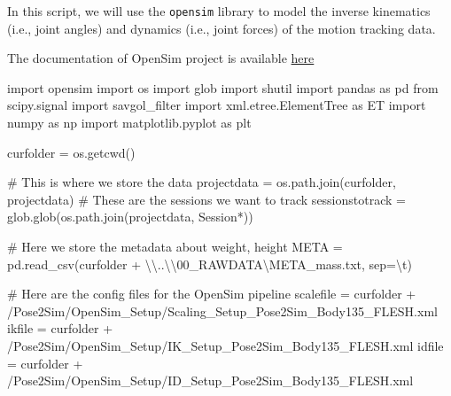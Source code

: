 \documentclass[
  letterpaper,
  DIV=11,
  numbers=noendperiod]{scrreprt}
\newenvironment{Shaded}{\begin{snugshade}}{\end{snugshade}}
\newcommand{\CharTok}[1]{\textcolor[rgb]{0.13,0.47,0.30}{#1}}
\newcommand{\CommentTok}[1]{\textcolor[rgb]{0.37,0.37,0.37}{#1}}
\newcommand{\ImportTok}[1]{\textcolor[rgb]{0.00,0.46,0.62}{#1}}
\newcommand{\NormalTok}[1]{\textcolor[rgb]{0.00,0.23,0.31}{#1}}
\newcommand{\OperatorTok}[1]{\textcolor[rgb]{0.37,0.37,0.37}{#1}}
\newcommand{\StringTok}[1]{\textcolor[rgb]{0.13,0.47,0.30}{#1}}
\begin{document}
In this script, we will use the \texttt{opensim} library to model the
inverse kinematics (i.e., joint angles) and dynamics (i.e., joint
forces) of the motion tracking data.

The documentation of OpenSim project is available
\href{https://opensimconfluence.atlassian.net/wiki/spaces/OpenSim/overview}{here}

\begin{Shaded}
\begin{Highlighting}[]
\ImportTok{import}\NormalTok{ opensim}
\ImportTok{import}\NormalTok{ os}
\ImportTok{import}\NormalTok{ glob}
\ImportTok{import}\NormalTok{ shutil}
\ImportTok{import}\NormalTok{ pandas }\ImportTok{as}\NormalTok{ pd}
\ImportTok{from}\NormalTok{ scipy.signal }\ImportTok{import}\NormalTok{ savgol\_filter}
\ImportTok{import}\NormalTok{ xml.etree.ElementTree }\ImportTok{as}\NormalTok{ ET}
\ImportTok{import}\NormalTok{ numpy }\ImportTok{as}\NormalTok{ np}
\ImportTok{import}\NormalTok{ matplotlib.pyplot }\ImportTok{as}\NormalTok{ plt}

\NormalTok{curfolder }\OperatorTok{=}\NormalTok{ os.getcwd()}

\CommentTok{\# This is where we store the data}
\NormalTok{projectdata }\OperatorTok{=}\NormalTok{ os.path.join(curfolder, }\StringTok{\textquotesingle{}projectdata\textquotesingle{}}\NormalTok{)}
\CommentTok{\# These are the sessions we want to track}
\NormalTok{sessionstotrack }\OperatorTok{=}\NormalTok{ glob.glob(os.path.join(projectdata, }\StringTok{\textquotesingle{}Session*\textquotesingle{}}\NormalTok{))}

\CommentTok{\# Here we store the metadata about weight, height}
\NormalTok{META }\OperatorTok{=}\NormalTok{ pd.read\_csv(curfolder }\OperatorTok{+} \StringTok{\textquotesingle{}}\CharTok{\textbackslash{}\textbackslash{}}\StringTok{..}\CharTok{\textbackslash{}\textbackslash{}}\StringTok{00\_RAWDATA\textbackslash{}META\_mass.txt\textquotesingle{}}\NormalTok{, sep}\OperatorTok{=}\StringTok{\textquotesingle{}}\CharTok{\textbackslash{}t}\StringTok{\textquotesingle{}}\NormalTok{)}

\CommentTok{\# Here are the config files for the OpenSim pipeline}
\NormalTok{scalefile }\OperatorTok{=}\NormalTok{ curfolder }\OperatorTok{+} \StringTok{\textquotesingle{}/Pose2Sim/OpenSim\_Setup/Scaling\_Setup\_Pose2Sim\_Body135\_FLESH.xml\textquotesingle{}}
\NormalTok{ikfile }\OperatorTok{=}\NormalTok{ curfolder }\OperatorTok{+} \StringTok{\textquotesingle{}/Pose2Sim/OpenSim\_Setup/IK\_Setup\_Pose2Sim\_Body135\_FLESH.xml\textquotesingle{}}
\NormalTok{idfile }\OperatorTok{=}\NormalTok{ curfolder }\OperatorTok{+} \StringTok{\textquotesingle{}/Pose2Sim/OpenSim\_Setup/ID\_Setup\_Pose2Sim\_Body135\_FLESH.xml\textquotesingle{}}


\end{Highlighting}
\end{Shaded}
\end{document}
